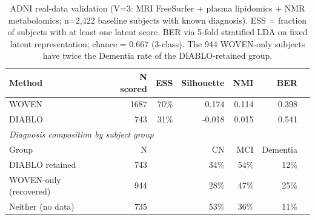 \begin{table}[ht]
\centering
\caption{ADNI real-data validation (V=3: MRI FreeSurfer + plasma lipidomics + NMR metabolomics; n=2{,}422 baseline subjects with known diagnosis). ESS = fraction of subjects with at least one latent score. BER via 5-fold stratified LDA on fixed latent representation; chance = 0.667 (3-class). The 944 WOVEN-only subjects have twice the Dementia rate of the DIABLO-retained group.}
\label{tab:adni}
\begin{tabular}{lrrrrrr}
\toprule
Method & N scored & ESS & Silhouette & NMI & BER \\
\midrule
WOVEN & 1687 & 70\% & 0.174 & 0.114 & 0.398 \\
DIABLO & 743 & 31\% & -0.018 & 0.015 & 0.541 \\
\midrule
\multicolumn{6}{l}{\textit{Diagnosis composition by subject group}} \\
\midrule
Group & N & & CN & MCI & Dementia \\
\midrule
DIABLO retained & 743 & & 34\% & 54\% & 12\% \\
WOVEN-only (recovered) & 944 & & 28\% & 47\% & 25\% \\
Neither (no data) & 735 & & 53\% & 36\% & 11\% \\
\bottomrule
\end{tabular}
\end{table}

